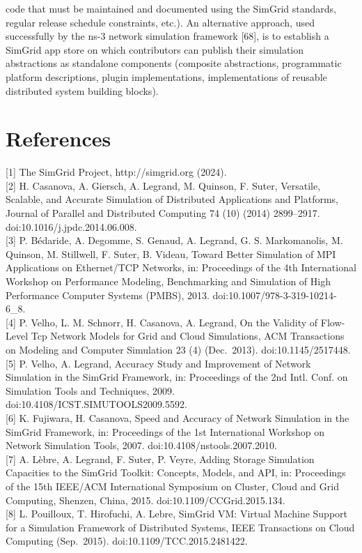 \documentclass[
]{article}
\begin{document}
code that must be maintained and documented using the SimGrid standards,
regular release schedule constraints, etc.). An alternative approach,
used successfully by the ns-3 network simulation framework {[}68{]}, is
to establish a SimGrid app store on which contributors can publish their
simulation abstractions as standalone components (composite
abstractions, programmatic platform descriptions, plugin
implementations, implementations of reusable distributed system building
blocks).

\section{References}\label{references}

{[}1{]} The SimGrid Project, http://simgrid.org (2024).\\
{[}2{]} H. Casanova, A. Giersch, A. Legrand, M. Quinson, F. Suter,
Versatile, Scalable, and Accurate Simulation of Distributed Applications
and Platforms, Journal of Parallel and Distributed Computing 74 (10)
(2014) 2899--2917. doi:10.1016/j.jpdc.2014.06.008.\\
{[}3{]} P. Bédaride, A. Degomme, S. Genaud, A. Legrand, G. S.
Markomanolis, M. Quinson, M. Stillwell, F. Suter, B. Videau, Toward
Better Simulation of MPI Applications on Ethernet/TCP Networks, in:
Proceedings of the 4th International Workshop on Performance Modeling,
Benchmarking and Simulation of High Performance Computer Systems (PMBS),
2013. doi:10.1007/978-3-319-10214-6\_8.\\
{[}4{]} P. Velho, L. M. Schnorr, H. Casanova, A. Legrand, On the
Validity of Flow-Level Tcp Network Models for Grid and Cloud
Simulations, ACM Transactions on Modeling and Computer Simulation 23 (4)
(Dec.~2013). doi:10.1145/2517448.\\
{[}5{]} P. Velho, A. Legrand, Accuracy Study and Improvement of Network
Simulation in the SimGrid Framework, in: Proceedings of the 2nd Intl.
Conf. on Simulation Tools and Techniques, 2009.
doi:10.4108/ICST.SIMUTOOLS2009.5592.\\
{[}6{]} K. Fujiwara, H. Casanova, Speed and Accuracy of Network
Simulation in the SimGrid Framework, in: Proceedings of the 1st
International Workshop on Network Simulation Tools, 2007.
doi:10.4108/nstools.2007.2010.\\
{[}7{]} A. Lèbre, A. Legrand, F. Suter, P. Veyre, Adding Storage
Simulation Capacities to the SimGrid Toolkit: Concepts, Models, and API,
in: Proceedings of the 15th IEEE/ACM International Symposium on Cluster,
Cloud and Grid Computing, Shenzen, China, 2015.
doi:10.1109/CCGrid.2015.134.\\
{[}8{]} L. Pouilloux, T. Hirofuchi, A. Lebre, SimGrid VM: Virtual
Machine Support for a Simulation Framework of Distributed Systems, IEEE
Transactions on Cloud Computing (Sep.~2015).
doi:10.1109/TCC.2015.2481422.
\end{document}
